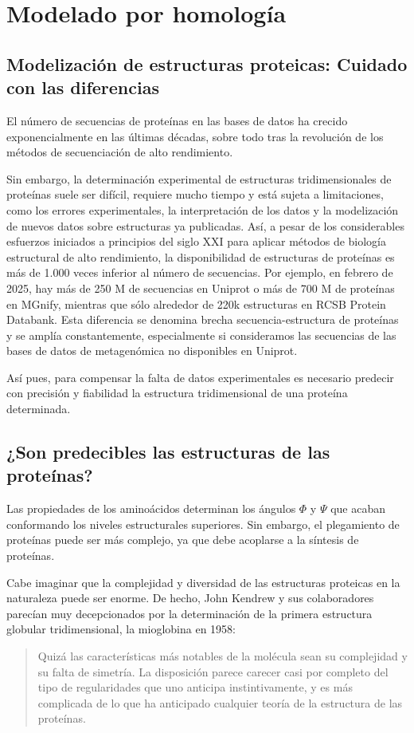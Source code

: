 \chapter{Modelado por homología}
\section{Modelización de estructuras proteicas: Cuidado con las diferencias}
El número de secuencias de proteínas en las bases de datos ha crecido exponencialmente en las últimas décadas, sobre todo tras la revolución de los métodos de secuenciación de alto rendimiento.

Sin embargo, la determinación experimental de estructuras tridimensionales de proteínas suele ser difícil, requiere mucho tiempo y está sujeta a limitaciones, como los errores experimentales, la interpretación de los datos y la modelización de nuevos datos sobre estructuras ya publicadas. Así, a pesar de los considerables esfuerzos iniciados a principios del siglo XXI para aplicar métodos de biología estructural de alto rendimiento, la disponibilidad de estructuras de proteínas es más de 1.000 veces inferior al número de secuencias. Por ejemplo, en febrero de 2025, hay más de 250 M de secuencias en Uniprot o más de 700 M de proteínas en MGnify, mientras que sólo alrededor de 220k estructuras en RCSB Protein Databank. Esta diferencia se denomina brecha secuencia-estructura de proteínas y se amplía constantemente, especialmente si consideramos las secuencias de las bases de datos de metagenómica no disponibles en Uniprot.

Así pues, para compensar la falta de datos experimentales es necesario predecir con precisión y fiabilidad la estructura tridimensional de una proteína determinada.

\section{¿Son predecibles las estructuras de las proteínas?}
Las propiedades de los aminoácidos determinan los ángulos $\Phi$ y $\Psi$ que acaban conformando los niveles estructurales superiores. Sin embargo, el plegamiento de proteínas puede ser más complejo, ya que debe acoplarse a la síntesis de proteínas.

Cabe imaginar que la complejidad y diversidad de las estructuras proteicas en la naturaleza puede ser enorme. De hecho, John Kendrew y sus colaboradores parecían muy decepcionados por la determinación de la primera estructura globular tridimensional, la mioglobina en 1958:
\begin{quote}
Quizá las características más notables de la molécula sean su complejidad y su falta de simetría. La disposición parece carecer casi por completo del tipo de regularidades que uno anticipa instintivamente, y es más complicada de lo que ha anticipado cualquier teoría de la estructura de las proteínas.
\end{quote}

